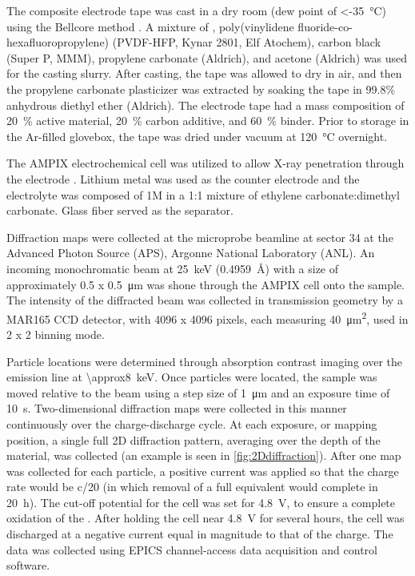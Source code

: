 \documentclass{article}
\begin{document}
The \nca{} composite electrode tape was cast in a dry room (dew point
of \SI{<-35}{\celsius}) using the Bellcore method \cite{warren1996}. A
mixture of \nca{}, poly(vinylidene fluoride-co-hexafluoropropylene)
(PVDF-HFP, Kynar 2801, Elf Atochem), carbon black (Super P, MMM),
propylene carbonate (Aldrich), and acetone (Aldrich) was used for the
casting slurry. After casting, the tape was allowed to dry in air, and
then the propylene carbonate plasticizer was extracted by soaking the
tape in 99.8\% anhydrous diethyl ether (Aldrich). The electrode tape
had a mass composition of \SI{20}{\percent} active material,
\SI{20}{\percent} carbon additive, and \SI{60}{\percent} binder. Prior
to storage in the Ar-filled glovebox, the tape was dried under vacuum
at \SI{120}{\celsius} overnight.

The AMPIX electrochemical cell was utilized to allow X-ray penetration
through the electrode \cite{borkiewicz2012}. Lithium metal was used as
the counter electrode and the electrolyte was composed of 1M
 in a 1:1 mixture of ethylene carbonate:dimethyl
carbonate. Glass fiber served as the separator.

Diffraction maps were collected at the microprobe beamline at sector
34 at the Advanced Photon Source (APS), Argonne National Laboratory
(ANL). An incoming monochromatic beam at \SI{25}{\kilo\electronvolt}
(\SI{0.4959}{\angstrom}) with a size of approximately \num{0.5} x
\SI{0.5}{\micro\meter} was shone through the AMPIX cell onto the
sample. The intensity of the diffracted beam was collected in
transmission geometry by a MAR165 CCD detector, with 4096 x 4096
pixels, each measuring \SI{40}{\square\micro\meter}, used in 2 x 2
binning mode.

Particle locations were determined through absorption contrast imaging
over the  emission line at
\SI{\approx8}{\kilo\electronvolt}. Once particles were located, the
sample was moved relative to the beam using a step size of
\SI{1}{\micro\meter} and an exposure time of
\SI{10}{\second}. Two-dimensional diffraction maps were collected in
this manner continuously over the charge-discharge cycle. At each
exposure, or mapping position, a single full 2D diffraction pattern,
averaging over the depth of the material, was collected (an example is
seen in \ref{fig:2Ddiffraction}). After one map was collected for each
particle, a positive current was applied so that the charge rate would
be c/20 (in which removal of a full  equivalent would complete
in \SI{20}{\hour}). The cut-off potential for the cell was set for
\SI{4.8}{\volt}, to ensure a complete oxidation of the \nca{}. After
holding the cell near \SI{4.8}{\volt} for several hours, the cell was
discharged at a negative current equal in magnitude to that of the
charge. The data was collected using EPICS channel-access data
acquisition and control software.
\end{document}
